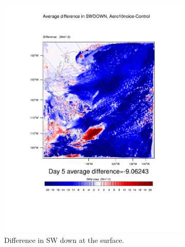 \begin{figure}
\centering
	\begin{subfigure}{0.48\textwidth}
		\includegraphics[width=\textwidth]{results/aero10ni/diff_Aero10NoIce_SWDOWN_Day5.pdf}
		\caption{Difference in SW down at the surface.}
		\label{subfig:swdown_r4Day5}
	\end{subfigure}
	\quad
	\begin{subfigure}{0.48\textwidth}
		\centering

\end{subfigure}
\end{figure}
